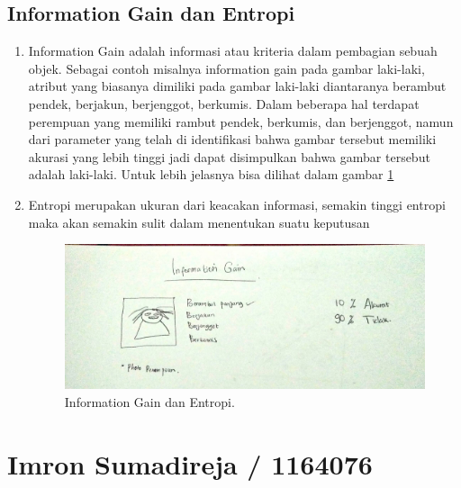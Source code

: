 \subsection{Information Gain dan Entropi}
\begin{enumerate}
\item Information Gain adalah informasi atau kriteria dalam pembagian sebuah objek. Sebagai contoh misalnya information gain pada gambar laki-laki, atribut yang biasanya dimiliki pada gambar laki-laki diantaranya berambut pendek, berjakun, berjenggot, berkumis. Dalam beberapa hal terdapat perempuan yang memiliki rambut pendek, berkumis, dan berjenggot, namun dari parameter yang telah di identifikasi bahwa gambar tersebut memiliki akurasi yang lebih tinggi jadi dapat disimpulkan bahwa gambar tersebut adalah laki-laki. Untuk lebih jelasnya bisa dilihat dalam gambar \ref{IGE}

\item Entropi merupakan ukuran dari keacakan informasi, semakin tinggi entropi maka akan semakin sulit dalam menentukan suatu keputusan
		\begin{figure}[ht]
		\centerline{\includegraphics[width=1\textwidth]{figures/im/im77.jpg}}
		\caption{Information Gain dan Entropi.}
		\label{IGE}
		\end{figure}
\end{enumerate}

\section{Imron Sumadireja / 1164076}
